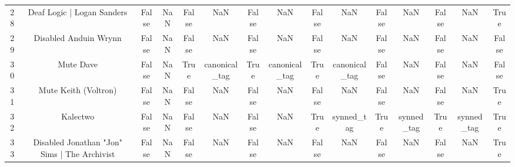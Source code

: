 \begin{table}[h!]
{\begin{tabular}{|c|c|c|c|c|c|c|c|c|c|c|c|c|c|c|}
         28 &                        Deaf Logic | Logan Sanders &                          False &                       NaN &                          False &                       NaN &                          False &                       NaN &                          False &                       NaN &                          False &                       NaN &                          False &                       NaN &                           True \\
         29 &                             Disabled Anduin Wrynn &                          False &                       NaN &                          False &                       NaN &                          False &                       NaN &                          False &                       NaN &                          False &                       NaN &                          False &                       NaN &                          False \\
         30 &                                         Mute Dave &                          False &                       NaN &                           True &             canonical\_tag &                           True &             canonical\_tag &                           True &             canonical\_tag &                          False &                       NaN &                          False &                       NaN &                          False \\
         31 &                              Mute Keith (Voltron) &                          False &                       NaN &                          False &                       NaN &                          False &                       NaN &                          False &                       NaN &                          False &                       NaN &                          False &                       NaN &                           True \\
         32 &                                          Kalectwo &                          False &                       NaN &                          False &                       NaN &                          False &                       NaN &                           True &                synned\_tag &                           True &                synned\_tag &                           True &                synned\_tag &                           True \\
         33 &      Disabled Jonathan "Jon" Sims | The Archivist &                          False &                       NaN &                          False &                       NaN &                          False &                       NaN &                          False &                       NaN &                          False &                       NaN &                          False &                       NaN &                           True \\

\end{tabular}}
\end{table}
